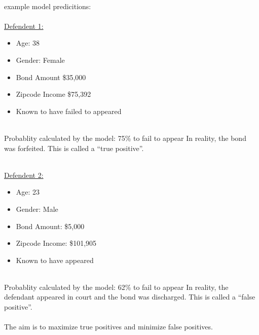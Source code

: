 \documentclass{article}
\begin{document}
%
~\\
example model predicitions:
~\\
~\\
\underline{Defendent 1:}
~\\
\begin{itemize}
\item Age: 38
\item Gender: Female 
\item Bond Amount \$35,000
\item Zipcode Income  \$75,392
\item Known to have failed to appeared
\end{itemize}
~\\
Probablity calculated by the model: 75\% to fail to appear
In reality, the bond was forfeited. This is called a ``true positive''.


~\\
\underline{Defendent 2:}
~\\
\begin{itemize}
\item Age:             23   
\item Gender:          Male
\item Bond Amount:    \$5,000
\item Zipcode Income: \$101,905
\item Known to have appeared
\end{itemize}
~\\
Probablity calculated by the model: 62\% to fail to appear
In reality, the defendant appeared in court and the bond was discharged. 
This is called a ``false positive''.
~\\
~\\
The aim is to maximize true positives and minimize false positives. 
\end{document}
